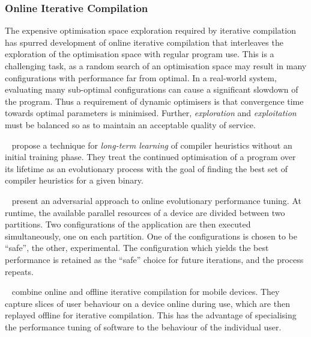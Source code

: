 \subsubsection{Online Iterative Compilation}

The expensive optimisation space exploration required by iterative compilation has spurred development of online iterative compilation that interleaves the exploration of the optimisation space with regular program use. This is a challenging task, as a random search of an optimisation space may result in many configurations with performance far from optimal. In a real-world system, evaluating many sub-optimal configurations can cause a significant slowdown of the program. Thus a requirement of dynamic optimisers is that convergence time towards optimal parameters is minimised. Further, \emph{exploration} and \emph{exploitation} must be balanced so as to maintain an acceptable quality of service.

\citeauthor{Tartara2013}~\cite{Tartara2013} propose a technique for \emph{long-term learning} of compiler heuristics without an initial training phase. They treat the continued optimisation of a program over its lifetime as an evolutionary process with the goal of finding the best set of compiler heuristics for a given binary.

\citeauthor{Ansel2012}~\cite{Ansel2012} present an adversarial approach to online evolutionary performance tuning. At runtime, the available parallel resources of a device are divided between two partitions. Two configurations of the application are then executed simultaneously, one on each partition. One of the configurations is chosen to be ``safe'', the other, experimental. The configuration which yields the best performance is retained as the ``safe'' choice for future iterations, and the process repeats.

\citeauthor{Mpeis2015}~\cite{Mpeis2015} combine online and offline iterative compilation for mobile devices. They capture slices of user behaviour on a device online during use, which are then replayed offline for iterative compilation. This has the advantage of specialising the performance tuning of software to the behaviour of the individual user.


